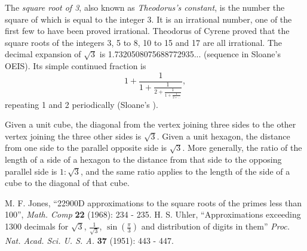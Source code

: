 \documentclass[12pt]{article}
\begin{document}
The \emph{square root of 3}, also known as \emph{Theodorus's constant}, is the number the square of which is equal to the integer 3. It is an irrational number, one of the first few to have been proved irrational. Theodorus of Cyrene proved that the square roots of the integers 3, 5 to 8, 10 to 15 and 17 are all irrational. The decimal expansion of $\sqrt{3}$ is 1.7320508075688772935... (sequence  in Sloane's OEIS). Its simple continued fraction is $$1 + \frac{1}{1 + \frac{1}{2 + \frac{1}{1 + \frac{1}{2 + \ldots}}}},$$ repeating 1 and 2 periodically (Sloane's ).

Given a unit cube, the diagonal from the vertex joining three sides to the other vertex joining the three other sides is $\sqrt{3}$. Given a unit hexagon, the distance from one side to the parallel opposite side is $\sqrt{3}$. More generally, the ratio of the length of a side of a hexagon to the distance from that side to the opposing parallel side is $1 : \sqrt{3}$, and the same ratio applies to the length of the side of a cube to the diagonal of that cube.

\begin{thebibliography}{1}
 M. F. Jones, ``22900D approximations to the square roots of the primes less than 100'', {\it Math. Comp} {\bf 22} (1968): 234 - 235. 
 H. S. Uhler, ``Approximations exceeding 1300 decimals for $\sqrt{3}$, $\frac{1}{\sqrt{3}}$, $\sin(\frac{\pi}{3})$ and distribution of digits in them'' {\it Proc. Nat. Acad. Sci. U. S. A.} {\bf 37} (1951): 443 - 447.
\end{thebibliography}
\end{document}
